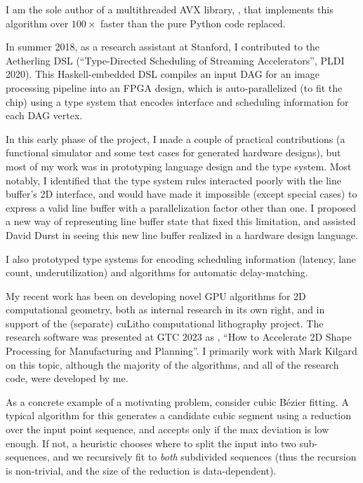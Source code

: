 I am the sole author of a multithreaded AVX
library, ,
that implements this algorithm over $100\times$ faster than the pure
Python code replaced.

In summer 2018, as a research assistant at Stanford, I contributed to
the Aetherling DSL (``Type-Directed Scheduling of Streaming
Accelerators'', PLDI 2020). This Haskell-embedded DSL compiles an
input DAG for an image processing pipeline into an FPGA design, which
is auto-parallelized (to fit the chip) using a type system that
encodes interface and scheduling information for each DAG vertex.

In this early phase of the project, I made a couple of practical
contributions (a functional simulator and some test cases for
generated hardware designs), but most of my work was in prototyping
language design and the type system.  Most notably, I identified that
the type system rules interacted poorly with the line buffer's 2D
interface, and would have made it impossible (except special cases) to
express a valid line buffer with a parallelization factor other than
one. I proposed a new way of representing line buffer state that fixed
this limitation, and assisted David Durst in seeing this new line
buffer realized in a hardware design language.

I also prototyped type systems for encoding scheduling information
(latency, lane count, underutilization) and algorithms for automatic
delay-matching.

\filbreak

My recent work has been on developing novel GPU algorithms for 2D
computational geometry, both as internal research in its own right,
and in support of the (separate) cuLitho computational lithography
project. The research software was presented at GTC 2023 as
, ``How to Accelerate 2D Shape Processing for Manufacturing and
Planning''. I primarily work with Mark Kilgard on this topic, although
the majority of the algorithms, and all of the research code, were
developed by me.

As a concrete example of a motivating problem, consider cubic Bézier
fitting. A typical algorithm for this generates a candidate cubic
segment using a reduction over the input point sequence, and accepts
only if the max deviation is low enough. If not, a heuristic chooses
where to split the input into two sub-sequences, and we recursively
fit to \textit{both} subdivided sequences (thus the recursion is
non-trivial, and the size of the reduction is data-dependent).

